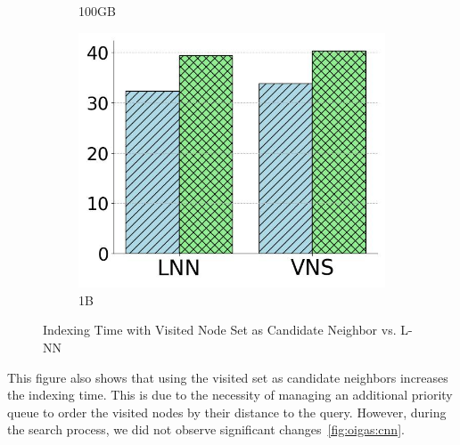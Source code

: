 \begin{figure}[htbp]
\begin{subfigure}{0.28\textwidth}
        \caption{100GB}
       \label{fig:VNvsLNN:100GB}
    \end{subfigure}    
         \begin{subfigure}{0.28\textwidth}
             \captionsetup{justification=centering}
	\centering	
        \includegraphics[width=\textwidth]{../img/oigas/CandNeighbors/1B_Idx.jpg}
        \caption{1B}
      \label{fig:VNvsLNN:1B}
    \end{subfigure}
            \caption{Indexing Time with Visited Node Set as Candidate Neighbor vs. L-NN}
            \label{fig:oigas:lnn_vs_vsn_comparison}
    \end{figure}

This figure also shows that using the visited set as candidate neighbors increases the indexing time. This is due to the necessity of managing an additional priority queue to order the visited nodes by their distance to the query. However, during the search process, we did not observe significant changes~\ref{fig:oigas:cnn}.

